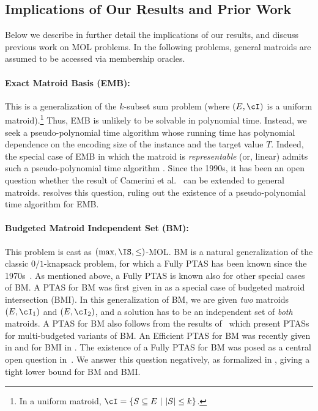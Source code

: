 \subsection{Implications of Our Results and Prior Work}
\label{sec:results}		

Below we describe in further detail the implications of our results, and discuss previous work on MOL problems. In the following problems, general matroids are assumed to be accessed via membership oracles. 

\paragraph{Exact Matroid Basis (EMB):}
This is a generalization of the $k$-{\sc subset sum} problem (where $(E,\cI)$ is a uniform matroid).\footnote{In a uniform matroid, $\cI= \{S \subseteq E~|~ |S| \leq k\}$.} Thus, EMB is unlikely to be solvable in polynomial time. Instead, we seek a pseudo-polynomial time algorithm whose running time has polynomial dependence on the encoding size of the instance and the target value $T$. 
Indeed, the special case of EMB in which the matroid is {\em representable} (or, linear) admits such  a pseudo-polynomial time algorithm \cite{CGM92}. Since the 1990s, it has been an open question whether the result of Camerini et al.~\cite{CGM92} can be extended to general matroids. 
 resolves this question, ruling out the existence of  a pseudo-polynomial time algorithm for EMB.

\paragraph{Budgeted Matroid Independent Set (BM):} 

This problem is cast as $(\max,\IS,\leq)$-MOL. BM is a natural generalization of the classic $0/1${\sc-knapsack} problem, for which a Fully PTAS has been known since the 1970s~\cite{La79}. As mentioned above, a Fully PTAS is known also for other special cases of BM. A PTAS for BM was first given in \cite{BBGS11} as a special case of {\sc budgeted matroid intersection (BMI)}. In this generalization of BM, we are given {\em two} matroids $(E,\cI_1)$ and $(E,\cI_2)$, and a solution has to be an independent set of {\em both} matroids. A PTAS for BM also follows from 
the results of~\cite{GZ10,CVZ11} which present PTASs for multi-budgeted variants of BM. An Efficient PTAS for BM was recently given in \cite{DKS23} and for BMI in \cite{DKS23b}. The existence of a Fully PTAS for BM was posed as a central open question in~\cite{BBGS11,DKS23,DKS23b}. We answer this question negatively, as formalized in , giving a tight lower bound for BM and BMI. %

